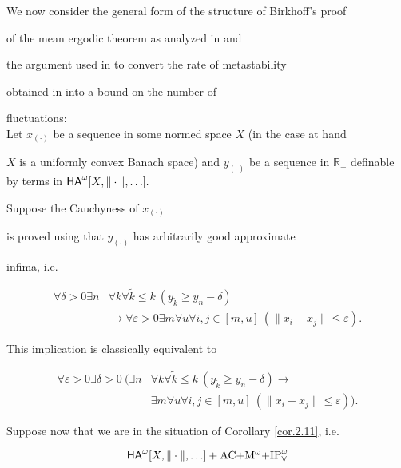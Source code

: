 \documentclass[1p]{elsarticle}
\newcommand{\usftext}[1]{\textsf{\upshape #1}}
\newcommand{\RR}{\ensuremath{\mathbb{R}}}
\newcommand{\ha}{\ensuremath{{\usftext{HA}}^\omega}} %
\theoremstyle{plain}
\theoremstyle{definition}
\theoremstyle{remark}
\renewenvironment{proof}[1][]{\noindent{\bf Proof{#1}. }}{\nopagebreak[4]{\hspace*{\fill}


  $\Box$              %

 }{\vspace{2ex}}}
\renewcommand{\epsilon}{\varepsilon}
\theoremstyle{definition}
\begin{document}
{\begin{proof}
\end{proof}



We now consider the general form of the structure of Birkhoff's proof 

of the mean ergodic theorem as analyzed in \cite{Kohlenbach/Leustean4} and 

the argument used in \cite{Avigad/Rute} to convert the rate of metastability 

obtained in \cite{Kohlenbach/Leustean4} into a bound on the number of 

fluctuations: \\[1mm]

Let $x_{(\cdot)}$ be a sequence in some normed space $X$ (in the case at hand 

$X$ is a uniformly convex Banach space) and $y_{(\cdot)}$ be a sequence in $\RR_+$ definable by terms in $\ha[X,\|\cdot\|,\ldots].$ 

Suppose the Cauchyness of $x_{(\cdot)}$ 

is proved using that $y_{(\cdot)}$ has arbitrarily good approximate 

infima, i.e.

\begin{align}

\forall \delta>0\exists n &\forall k \forall \tilde k\le k\ (y_{\tilde k}\geq y_n-\delta)\\

&\rightarrow \forall \epsilon>0\exists m \forall u \forall i,j\in[m,u]\ (\|x_i-x_j\|\leq \epsilon).

\end{align} 

This implication is classically equivalent to 

\begin{align*}

\forall \epsilon>0 \exists \delta>0\ \Big( \exists n &\forall k \forall \tilde 

k\le k\ (y_{\tilde k}\geq y_n-\delta)\rightarrow \\ \tag{+}\label{e:U2}

&\exists m \forall u \forall i,j\in[m,u]\ (\|x_i-x_j\|\leq \epsilon) \Big).

\end{align*}

Suppose now that we are in the situation of Corollary \ref{cor.2.11}, i.e.  

\[

\ha[X,\|\cdot\|,\ldots]+\mbox{AC$+$M$^{\omega}+$IP}^{\omega}_{\forall} 

\]}
\end{document}
